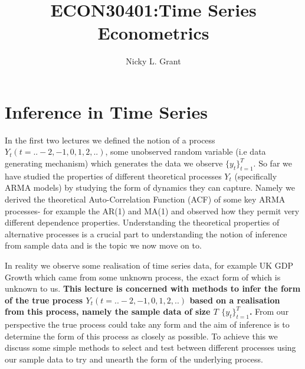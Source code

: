 \documentclass[openany]{tufte-book} %
\begin{document}
\title{ECON30401:Time Series Econometrics}
\author[Nicky L. Grant]{Nicky L. Grant}

\restoregeometry %
\nopagecolor%



\chapter{Inference in Time Series}

In the first two lectures we  defined the notion of a process $Y_t (t=..-2,-1,0,1,2,..)$, some unobserved random variable (i.e data generating mechanism) which generates the data we observe $\{y_t\}_{t=1}^T$. So far we have studied the properties of different theoretical processes $Y_t$  (specifically ARMA models) by studying the form of dynamics they can capture. Namely we derived the theoretical Auto-Correlation Function (ACF) of some key ARMA processes- for example the AR(1) and MA(1) and observed how they permit very different dependence properties. Understanding the theoretical properties of alternative processes is a crucial part to understanding the notion of inference from sample data and is the topic we now move on to.


 In reality we observe some realisation of time series data, for example UK GDP Growth  which came from some unknown process,  the exact form of which is unknown to us. \textbf{This lecture is concerned with methods to infer the form of the true process $Y_t (t=..-2,-1,0,1,2,..)$  based on a realisation from this process, namely the sample data of size $T$  $\{y_t\}_{t=1}^T$.} From our perspective the true process could take any form and the aim of inference is to determine  the form of this process as closely as possible. To achieve this we discuss some simple methods to select and test between different processes using our sample data to try and unearth the form of the underlying process.
\end{document}
